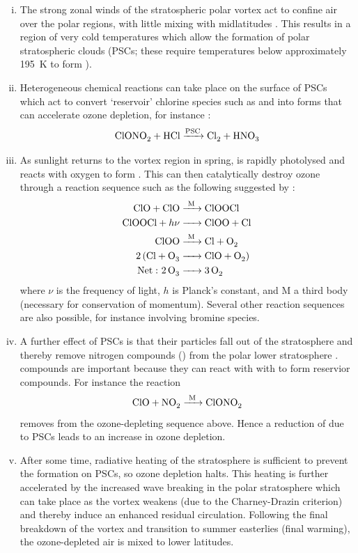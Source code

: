\begin{enumerate}[i.]
\item The strong zonal winds of the stratospheric polar vortex act to confine
  air over the polar regions, with little mixing with midlatitudes
  \citep{Schoeberl1991}. This results in a region of very cold temperatures
  which allow the formation of polar stratospheric clouds (PSCs; these require
  temperatures below approximately 195~K to form \citep{Newman2010}).
\item Heterogeneous chemical reactions can take place on the surface of PSCs which
  act to convert `reservoir' chlorine species such as  and 
  into forms that can accelerate ozone depletion, for instance
  \citep{Solomon1986}:
  \begin{equation*}
    \ce{ClONO2 + HCl ->[\ce{PSC}] Cl2 + HNO3}
  \end{equation*}
\item As sunlight returns to the vortex region in spring,  is rapidly
  photolysed and reacts with oxygen to form . This can then
  catalytically destroy ozone through a reaction sequence such as the following
  suggested by \citet{Molina1987}:
  \begin{align*}
    \cee{ClO + ClO &->[\ce{M}] ClOOCl \\
         ClOOCl + $h\nu$ &-> ClOO + Cl \\
         ClOO &->[\ce{M}] Cl + O2 \\
         2(Cl + O3 &-> ClO + O2) \\
         $\mathrm{Net:~}$ 2O3 &-> 3O2} 
  \end{align*}
  where $\nu$ is the frequency of light,
  $h$ is Planck's constant, and M a third body (necessary for conservation of
  momentum). Several other reaction sequences are also possible, for instance
  involving bromine species.

\item A further effect of PSCs is that their particles fall out of the
  stratosphere and thereby remove nitrogen compounds
  () from the polar lower stratosphere \citep{Toon1986}.
   compounds are important because they can react with with 
  to form reservior compounds. For instance the reaction
  \begin{equation*}
    \ce{ClO + NO2 ->[\ce{M}] ClONO2}
  \end{equation*}
  removes  from the ozone-depleting sequence above. Hence a reduction of
   due to PSCs leads to an increase in ozone depletion.

\item After some time, radiative heating of the stratosphere is sufficient to
  prevent the formation on PSCs, so ozone depletion halts. This heating is
  further accelerated by the increased wave breaking in the polar stratosphere
  which can take place as the vortex weakens (due to the Charney-Drazin
  criterion) and thereby induce an enhanced residual circulation. Following the
  final breakdown of the vortex and transition to summer easterlies (final
  warming), the ozone-depleted air is mixed to lower latitudes.
\end{enumerate}


